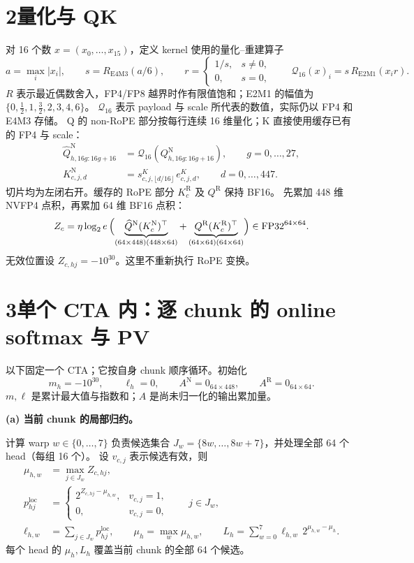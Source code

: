 \documentclass[UTF8,fontset=fandol,a4paper,10pt]{ctexart}
\newcommand{\FP}{\mathrm{FP32}}
\newcommand{\Qnt}{\mathcal{Q}_{16}}
\newcommand{\N}{\mathrm{N}}
\newcommand{\R}{\mathrm{R}}
\begin{document}
\section*{2\quad 量化与 QK}

对 16 个数 $x=(x_0,\ldots,x_{15})$，定义 kernel 使用的量化--重建算子
\[
  a=\max_i|x_i|,\qquad s=R_{\mathrm{E4M3}}(a/6),\qquad
  r=\begin{cases}1/s,&s\ne0,\\0,&s=0,\end{cases}
  \qquad \Qnt(x)_i=s\,R_{\mathrm{E2M1}}(x_i r).
\]
$R$ 表示最近偶数舍入，FP4/FP8 越界时作有限值饱和；E2M1 的幅值为
$\{0,\tfrac12,1,\tfrac32,2,3,4,6\}$。
$\Qnt$ 表示 payload 与 scale 所代表的数值，实际仍以 FP4 和 E4M3 存储。
Q 的 non-RoPE 部分按每行连续 16 维量化；K 直接使用缓存已有的 FP4 与 scale：
\begin{align*}
  \widehat Q^{\N}_{h,16g:16g+16}
    &=\Qnt(Q^{\N}_{h,16g:16g+16}),\qquad g=0,\ldots,27,\\
  K^{\N}_{c,j,d}
    &=s^K_{c,j,\lfloor d/16\rfloor}\,e^K_{c,j,d},\qquad d=0,\ldots,447.
\end{align*}
切片均为左闭右开。缓存的 RoPE 部分 $K_c^{\R}$ 及 $Q^{\R}$ 保持 BF16。
先累加 448 维 NVFP4 点积，再累加 64 维 BF16 点积：
\[
  Z_c=\eta\log_2e\,
  \Bigl(
    \underbrace{\widehat Q^{\N}(K_c^{\N})^\top}_{(64\times448)(448\times64)}
    +\underbrace{Q^{\R}(K_c^{\R})^\top}_{(64\times64)(64\times64)}
  \Bigr)\in\FP^{64\times64}.
\]
无效位置设 $Z_{c,hj}=-10^{30}$。这里不重新执行 RoPE 变换。

\section*{3\quad 单个 CTA 内：逐 chunk 的 online softmax 与 PV}

以下固定一个 CTA；它按自身 chunk 顺序循环。初始化
\[
  m_h=-10^{30},\qquad \ell_h=0,\qquad
  A^{\N}=0_{64\times448},\qquad A^{\R}=0_{64\times64}.
\]
$m,\ell$ 是累计最大值与指数和；$A$ 是尚未归一化的输出累加量。

\textbf{(a) 当前 chunk 的局部归约。}

计算 warp $w\in\{0,\ldots,7\}$ 负责候选集合
$J_w=\{8w,\ldots,8w+7\}$，并处理全部 64 个 head（每组 16 个）。
设 $v_{c,j}$ 表示候选有效，则
\begin{align*}
  \mu_{h,w}&=\max_{j\in J_w} Z_{c,hj},\\
  p^{\mathrm{loc}}_{hj}&=
    \begin{cases}2^{Z_{c,hj}-\mu_{h,w}},&v_{c,j}=1,\\0,&v_{c,j}=0,\end{cases}
    \qquad j\in J_w,\\
  \ell_{h,w}&=\sum_{j\in J_w}p^{\mathrm{loc}}_{hj},\qquad
  \mu_h=\max_w\mu_{h,w},\qquad
  L_h=\sum_{w=0}^{7}\ell_{h,w}\,2^{\mu_{h,w}-\mu_h}.
\end{align*}
每个 head 的 $\mu_h,L_h$ 覆盖当前 chunk 的全部 64 个候选。
\end{document}
